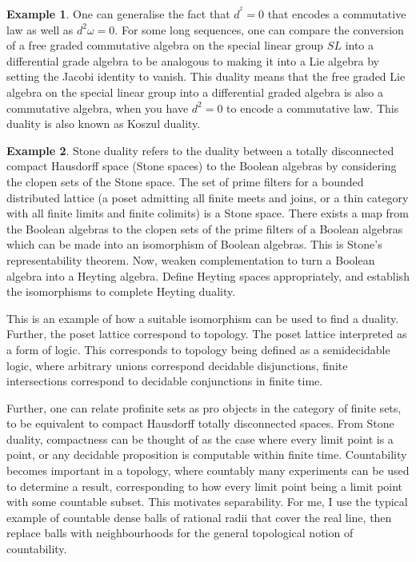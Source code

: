 \documentclass[10pt]{article}
\theoremstyle{plain}%
\theoremstyle{definition}
\newtheorem{example}{Example}[section]
\theoremstyle{remark}
\begin{document}
\begin{example}
	One can generalise the fact that $d^^2 = 0$ that encodes a commutative law as well as $d^2 \omega = 0$. For some long sequences, one can compare the conversion of a free graded commutative algebra on the special linear group $SL$ into a differential grade algebra to be analogous to making it into a Lie algebra by setting the Jacobi identity to vanish. This duality means that the free graded Lie algebra on the special linear group into a differential graded algebra is also a commutative algebra, when you have $d^2 = 0$ to encode a commutative law. This duality is also known as Koszul duality.
\end{example}

\begin{example}
	Stone duality refers to the duality between a totally disconnected compact Hausdorff space (Stone spaces) to the Boolean algebras by considering the clopen sets of the Stone space. The set of prime filters for a bounded distributed lattice (a poset admitting all finite meets and joins, or a  thin category with all finite limits and finite colimits) is a Stone space. There exists a map from the Boolean algebras to the clopen sets of the prime filters of a Boolean algebras which can be made into an isomorphism of Boolean algebras.
	This is Stone's representability theorem. Now, weaken complementation to turn a Boolean algebra into a Heyting algebra. Define Heyting spaces appropriately, and establish the isomorphisms to complete Heyting duality.

	This is an example of how a suitable isomorphism can be used to find a duality. Further, the poset lattice correspond to topology. The poset lattice interpreted as a form of logic. This corresponds to topology being defined as a semidecidable logic, where arbitrary unions correspond decidable disjunctions, finite intersections correspond to decidable conjunctions in finite time.

	Further, one can relate profinite sets as pro objects in the category of finite sets, to be equivalent to compact Hausdorff totally disconnected spaces. From Stone duality, compactness can be thought of as the case where every limit point is a point, or any decidable proposition is computable within finite time. Countability becomes important in a topology, where countably many experiments can be used to determine a result, corresponding to how every limit point being a limit point with some countable subset. This motivates separability. For me, I use the typical example of countable dense balls of rational radii that cover the real line, then replace balls with neighbourhoods for the general topological notion of countability.
\end{example}
\end{document}
